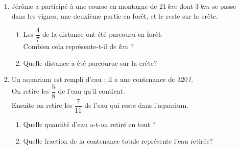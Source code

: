 \begin{multicols}{2}
\begin{enumerate}
\item J\'er\^ome a particip\'e \`a une course en montagne de $21~km$ dont $3~km$ se passe dans les vignes, une deuxi\`eme partie en for\^et, et le reste sur la cr\^ete.
\begin{enumerate}
\item Les $\dfrac{4}{7}$ de la distance ont \'et\'e parcouru en for\^et.\\ Combien cela repr\'esente-t-il de $km$ ?
\item Quelle distance a \'et\'e parcourue sur la cr\^ete?\\
\end{enumerate}

\columnbreak

\item Un aquarium est rempli d'eau ; il a une contenance de $320~l$. \\
On retire les $\dfrac{5}{8}$ de l'eau qu'il contient.\\
Ensuite on retire les $\dfrac{7}{11}$ de l'eau qui reste dans l'aquarium.
\begin{enumerate}
\item Quelle quantit\'e d'eau a-t-on retir\'e en tout ?
\item Quelle fraction de la contenance totale repr\'esente l'eau retir\'ee?
\end{enumerate}

\end{enumerate}
\end{multicols}

